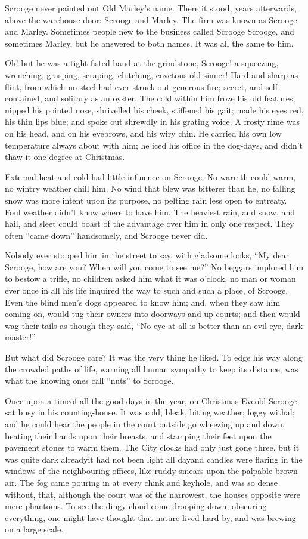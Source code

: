 \documentclass[paper=5.5in:8.5in,BCOR=5mm,twoside,DIV=calc,12pt,usegeometry]{scrbook} %
\begin{document}
Scrooge never painted out Old Marley's name. There it stood, years afterwards, above the warehouse door: Scrooge and Marley. The firm was known as Scrooge and Marley. Sometimes people new to the business called Scrooge Scrooge, and sometimes Marley, but he answered to both names. It was all the same to him.

Oh! but he was a tight-fisted hand at the grindstone, Scrooge! a squeezing, wrenching, grasping, scraping, clutching, covetous old sinner! Hard and sharp as flint, from which no steel had ever struck out generous fire; secret, and self-contained, and solitary as an oyster. The cold within him froze his old features, nipped his pointed nose, shrivelled his cheek, stiffened his gait; made his eyes red, his thin lips blue; and spoke out shrewdly in his grating voice. A frosty rime was on his head, and on his eyebrows, and his wiry chin. He carried his own low temperature always about with him; he iced his office in the dog-days, and didn't thaw it one degree at Christmas.

External heat and cold had little influence on Scrooge. No warmth could warm, no wintry weather chill him. No wind that blew was bitterer than he, no falling snow was more intent upon its purpose, no pelting rain less open to entreaty. Foul weather didn't know where to have him. The heaviest rain, and snow, and hail, and sleet could boast of the advantage over him in only one respect. They often \enquote{came down} handsomely, and Scrooge never did.

Nobody ever stopped him in the street to say, with gladsome looks, \enquote{My dear Scrooge, how are you? When will you come to see me?} No beggars implored him to bestow a trifle, no children asked him what it was o'clock, no man or woman ever once in all his life inquired the way to such and such a place, of Scrooge. Even the blind men's dogs appeared to know him; and, when they saw him coming on, would tug their owners into doorways and up courts; and then would wag their tails as though they said, \enquote{No eye at all is better than an evil eye, dark master!}

But what did Scrooge care? It was the very thing he liked. To edge his way along the crowded paths of life, warning all human sympathy to keep its distance, was what the knowing ones call \enquote{nuts} to Scrooge.

Once upon a time\textemdash of all the good days in the year, on Christmas Eve\textemdash old Scrooge sat busy in his counting-house. It was cold, bleak, biting weather; foggy withal; and he could hear the people in the court outside go wheezing up and down, beating their hands upon their breasts, and stamping their feet upon the pavement stones to warm them. The City clocks had only just gone three, but it was quite dark already\textemdash it had not been light all day\textemdash and candles were flaring in the windows of the neighbouring offices, like ruddy smears upon the palpable brown air. The fog came pouring in at every chink and keyhole, and was so dense without, that, although the court was of the narrowest, the houses opposite were mere phantoms. To see the dingy cloud come drooping down, obscuring everything, one might have thought that nature lived hard by, and was brewing on a large scale.
\end{document}
